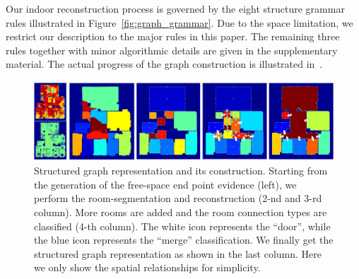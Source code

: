 Our indoor reconstruction process is governed by the eight structure
grammar rules illustrated in Figure~\ref{fig:graph_grammar}.
Due to the space limitation, we restrict our description to the major
rules in this paper. The remaining three rules together with minor
algorithmic details are given in the supplementary material. The actual progress of the graph construction is illustrated in~.
\begin{figure}[tb]
\begin{center}
\includegraphics[width=160mm]{../figures/graph2.pdf}
\end{center}
\caption{Structured graph representation and its construction. Starting
from the generation of the free-space end point evidence (left), we
perform the room-segmentation and reconstruction (2-nd and 3-rd column).
More rooms are added and the room connection types are classified (4-th
column). The white icon represents the ``door'', while the blue icon
 represents the ``merge'' classification.
 We finally get the structured graph representation as
shown in the last column. Here we only show the spatial relationships
for simplicity. }
   \label{fig:graph}
 \vspace{-0.325cm}
\end{figure}



